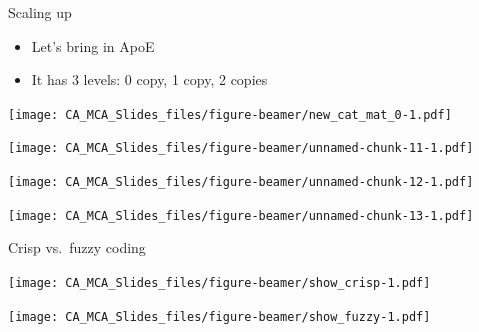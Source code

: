 \documentclass[
  ignorenonframetext,
]{beamer}
\providecommand{\tightlist}{%
  \setlength{\itemsep}{0pt}\setlength{\parskip}{0pt}}
\begin{document}
\begin{frame}{Scaling up}
\protect\hypertarget{scaling-up}{}

\begin{itemize}[<+->]
\tightlist
\item
  Let's bring in ApoE
\item
  It has 3 levels: 0 copy, 1 copy, 2 copies
\end{itemize}

\end{frame}

\begin{frame}

\texttt{[image: CA\_MCA\_Slides\_files/figure-beamer/new\_cat\_mat\_0-1.pdf]}

\end{frame}

\begin{frame}

\texttt{[image: CA\_MCA\_Slides\_files/figure-beamer/unnamed-chunk-11-1.pdf]}

\end{frame}

\begin{frame}

\texttt{[image: CA\_MCA\_Slides\_files/figure-beamer/unnamed-chunk-12-1.pdf]}

\end{frame}

\begin{frame}

\texttt{[image: CA\_MCA\_Slides\_files/figure-beamer/unnamed-chunk-13-1.pdf]}

\end{frame}

\begin{frame}{Crisp vs.~fuzzy coding}
\protect\hypertarget{crisp-vs.-fuzzy-coding}{}

\texttt{[image: CA\_MCA\_Slides\_files/figure-beamer/show\_crisp-1.pdf]}

\end{frame}

\begin{frame}

\texttt{[image: CA\_MCA\_Slides\_files/figure-beamer/show\_fuzzy-1.pdf]}

\end{frame}
\end{document}
